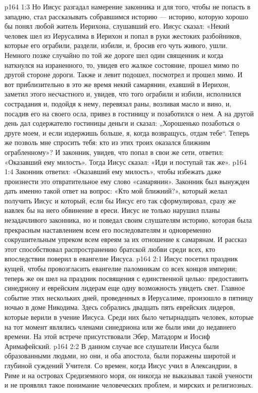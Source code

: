 \vs p164 1:3 Но Иисус разгадал намерение законника и для того, чтобы не попасть в западню, стал рассказывать собравшимся историю --- историю, которую хорошо бы понял любой житель Иерихона, слушавший его. Иисус сказал: «Некий человек шел из Иерусалима в Иерихон и попал в руки жестоких разбойников, которые его ограбили, раздели, избили, и, бросив его чуть живого, ушли. Немного позже случайно по той же дороге шел один священник и когда наткнулся на израненного, то, увидев его жалкое состояние, прошел мимо по другой стороне дороги. Также и левит подошел, посмотрел и прошел мимо. И вот приблизительно в это же время некий самарянин, ехавший в Иерихон, заметил этого несчастного и, увидев, что того ограбили и избили, исполнился сострадания и, подойдя к нему, перевязал раны, возливая масло и вино, и, посадив его на своего осла, привез в гостиницу и позаботился о нем. А на другой день дал содержателю гостиницы деньги и сказал: „Хорошенько позаботься о друге моем, и если издержишь больше, я, когда возвращусь, отдам тебе“. Теперь же позволь мне спросить тебя: кто из этих троих оказался ближним ограбленному»? И законник, увидев, что попал в свои же сети, ответил: «Оказавший ему милость». Тогда Иисус сказал: «Иди и поступай так же».
\vs p164 1:4 Законник ответил: «Оказавший ему милость», чтобы избежать даже произнести это отвратительное ему слово «самарянин». Законник был вынужден дать именно такой ответ на вопрос: «Кто мой ближний?», который желал получить Иисус и который, если бы Иисус его так сформулировал, сразу же навлек бы на него обвинение в ереси. Иисус не только нарушил планы незадачливого законника, но и поведал своим слушателям историю, которая была прекрасным наставлением всем его последователям и одновременно сокрушительным упреком всем евреям за их отношение к самарянам. И рассказ этот способствовал распространению братской любви среди всех, кто впоследствии поверил в евангелие Иисуса.
\vs p164 2:1 Иисус посетил праздник кущей, чтобы провозгласить евангелие паломникам со всех концов империи; теперь же он шел на праздник посвящения с единственной целью: предоставить синедриону и еврейским лидерам еще одну возможность увидеть свет. Главное событие этих нескольких дней, проведенных в Иерусалиме, произошло в пятницу ночью в доме Никодима. Здесь собрались двадцать пять еврейских лидеров, которые верили в учение Иисуса. Среди них было четырнадцать человек, которые на тот момент являлись членами синедриона или же были ими до недавнего времени. На этой встрече присутствовали Эбер, Матадорм и Иосиф Аримафейский.
\vs p164 2:2 В данном случае все слушатели Иисуса были образованными людьми, но они, и оба апостола, были поражены широтой и глубиной суждений Учителя. Со времен, когда Иисус учил в Александрии, в Риме и на островах Средиземного моря, он никогда не выказывал такой учености и не проявлял такое понимание человеческих проблем, и мирских и религиозных.
